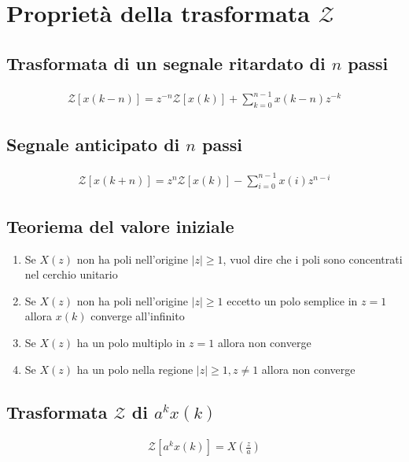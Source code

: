 \chapter{Propriet\`a della trasformata $\mathcal{Z}$}



\section{Trasformata di un segnale ritardato di $n$ passi}
\begin{align}
  \mathcal{Z}[x(k-n)] = z^{-n} \mathcal{Z}[x(k)] + \sum_{k=0}^{n-1} x(k-n) z^{-k}
\end{align}



\section{Segnale anticipato di $n$ passi}

\begin{align}
  \mathcal{Z}[x(k+n)] = z^{n} \mathcal{Z}[x(k)] - \sum_{i=0}^{n-1} x(i)z^{n-i}
\end{align}



\section{Teoriema del valore iniziale}
\begin{enumerate}
  \item Se $X(z)$ non ha poli nell'origine $|z| \geq 1$, vuol dire che i poli sono 
  concentrati nel cerchio unitario
  \item Se $X(z)$ non ha poli nell'origine $|z| \geq 1$ eccetto un polo semplice in 
  $z=1$ allora $x(k)$ converge all'infinito
  \item Se $X(z)$ ha un polo multiplo in $z=1$ allora non converge 
  \item Se $X(z)$ ha un polo nella regione $|z| \geq 1, z \neq 1$ allora non converge
\end{enumerate}

\section{Trasformata $\mathcal{Z}$ di $a^k x(k)$}
\begin{align}
  \mathcal{Z}[a^k x(k)] = X(\frac{z}{a})
\end{align}

